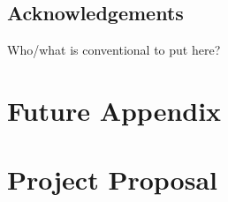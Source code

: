 \documentclass[12pt,a4paper,twoside,openright]{report}
\begin{document}
\bigskip
{}
\medskip
{}
\tableofcontents
\listoffigures

\newpage
\section*{Acknowledgements}
Who/what is conventional to put here?
\pagestyle{headings}






\printbibliography
\appendix
\chapter{Future Appendix}
\chapter{Project Proposal}

\end{document}
